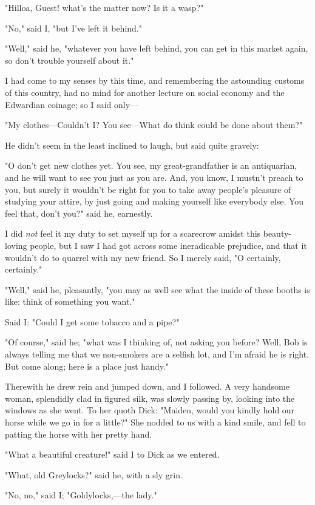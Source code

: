 "Hilloa, Guest! what's the matter now? Is it a wasp?"

"No," said I, "but I've left it behind."

"Well," said he, "whatever you have left behind, you can get in this
market again, so don't trouble yourself about it."

I had come to my senses by this time, and remembering the astounding
customs of this country, had no mind for another lecture on social
economy and the Edwardian coinage; so I said only---

"My clothes---Couldn't I? You see---What do think could be done about
them?"

He didn't seem in the least inclined to laugh, but said quite gravely:

"O don't get new clothes yet. You see, my great-grandfather is an
antiquarian, and he will want to see you just as you are. And, you know,
I mustn't preach to you, but surely it wouldn't be right for you to take
away people's pleasure of studying your attire, by just going and making
yourself like everybody else. You feel that, don't you?" said he,
earnestly.

I did \emph{not} feel it my duty to set myself up for a scarecrow amidst
this beauty-loving people, but I saw I had got across some ineradicable
prejudice, and that it wouldn't do to quarrel with my new friend. So I
merely said, "O certainly, certainly."

"Well," said he, pleasantly, "you may as well see what the inside of
these booths is like: think of something you want."

Said I: "Could I get some tobacco and a pipe?"

"Of course," said he; "what was I thinking of, not asking you before?
Well, Bob is always telling me that we non-smokers are a selfish lot,
and I'm afraid he is right. But come along; here is a place just handy."

Therewith he drew rein and jumped down, and I followed. A very handsome
woman, splendidly clad in figured silk, was slowly passing by, looking
into the windows as she went. To her quoth Dick: "Maiden, would you
kindly hold our horse while we go in for a little?" She nodded to us
with a kind smile, and fell to patting the horse with her pretty hand.

"What a beautiful creature!" said I to Dick as we entered.

"What, old Greylocks?" said he, with a sly grin.

"No, no," said I; "Goldylocks,---the lady."

